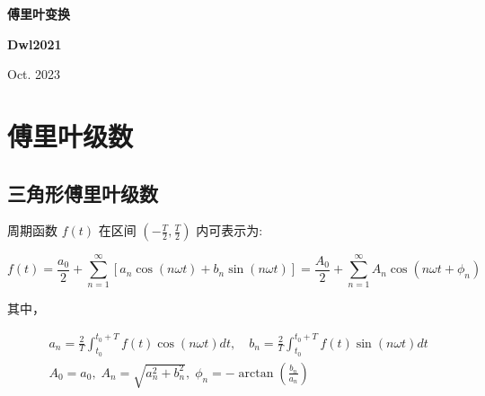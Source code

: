 \documentclass[UTF8]{article}
\theoremstyle{definition}
\begin{document}
\begin{titlepage}
    \begin{center}
        \vspace*{1cm}
        {
        \fontsize{30}{25}
        \selectfont 
        \textbf{傅里叶变换}

        \vspace*{2cm}
        
        \fontsize{30}{25}
        \selectfont 
        
        }

        \vspace{9cm}
        
        {
        \fontsize{20}{20}
        \textbf{}
        \vspace*{1cm}
        
        \textbf{Dwl2021}
  
        }
        
       
        
        \vfill

        {\fontsize{15}{20}\selectfont
        
        
        \vspace*{1cm}
        Oct. 2023
        }
        
        
    \end{center}
\end{titlepage}


\section{傅里叶级数}
\subsection{三角形傅里叶级数}
周期函数 $f(t)$ 在区间 $(-\frac{T}{2},\frac{T}{2})$ 内可表示为:

\begin{equation*}
f(t) = \frac{a_0}{2}+\sum_{n=1}^{\infty}\left[a_n \cos (n \omega t)+b_n \sin (n \omega t)\right] = \frac{A_0}{2}+\sum_{n=1}^{\infty} A_n \cos \left(n \omega t+\phi_n\right)
\end{equation*}

其中，

\begin{equation*}
\begin{aligned}
&a_n  =\frac{2}{T} \int_{t_0}^{t_0+T} f(t) \cos (n \omega t) d t ,\quad
b_n  =\frac{2}{T} \int_{t_0}^{t_0+T} f(t) \sin (n \omega t) d t \\ 
&A_0=a_0 ,\; A_n=\sqrt{a_n^2+b_n^2},  \; \phi_n=-\arctan \left(\frac{b_n}{a_n}\right)\\
\end{aligned}
\end{equation*}
\end{document}
